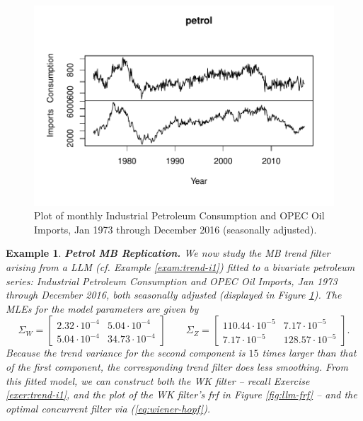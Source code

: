\documentclass[a4paper]{book}
\newtheorem{Example}{Example}
\begin{document}
  
\begin{figure}[htb!]
\begin{center}
\includegraphics[]{petrol_data.pdf}
\caption{Plot of monthly  Industrial Petroleum Consumption and OPEC Oil Imports, 
  Jan 1973 through December 2016 (seasonally adjusted). }
\label{fig:petroldata}
\end{center}
\end{figure}  

\begin{Example} {\bf Petrol MB Replication.} \rm
\label{exam:petrol-mb}
We now  study the  MB trend filter arising from a LLM  
(cf. Example \ref{exam:trend-i1}) fitted
 to a   bivariate petroleum series:
  Industrial Petroleum Consumption and OPEC Oil Imports, Jan 1973 through December 2016,
 both seasonally adjusted  (displayed in Figure \ref{fig:petroldata}).
   The MLEs for the model parameters are  given by
\[
 \Sigma_{W} = \left[ \begin{array}{ll} 
   2.32 \cdot 10^{-4} &  5.04 \cdot 10^{-4} \\
   5.04 \cdot 10^{-4}  & 34.73 \cdot 10^{-4}  \end{array}  \right]
 \qquad  \Sigma_{Z} = \left[ \begin{array}{ll}
        110.44 \cdot 10^{-5} &  7.17 \cdot 10^{-5}  \\
        7.17 \cdot 10^{-5} & 128.57 \cdot 10^{-5}   \end{array} \right].
\]
  Because the trend variance for the second component is $15$ times 
  larger than that of the first component,
 the corresponding trend filter  does less smoothing. 
 From this fitted model,  we can construct both the WK filter -- recall Exercise
  \ref{exer:trend-i1}, and the plot of the WK filter's frf in Figure \ref{fig:llm-frf} --
  and the optimal concurrent filter via (\ref{eq:wiener-hopf}).
\end{Example}
\end{document}
